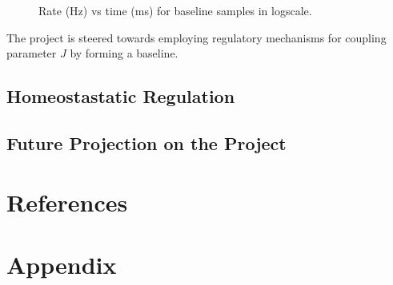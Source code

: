 \documentclass[a4paper,12pt]{article}
\begin{document}
\begin{figure}[htbp] 
    \caption{Rate (Hz) vs time (ms) for baseline samples in logscale.}
    \label{ratevstime}
\end{figure}

The project is steered towards employing regulatory mechanisms for coupling parameter $J$ by forming a baseline.


\subsection{Homeostastatic Regulation}
\subsection{Future Projection on the Project}

\section{References}


\section{Appendix}
\end{document}
